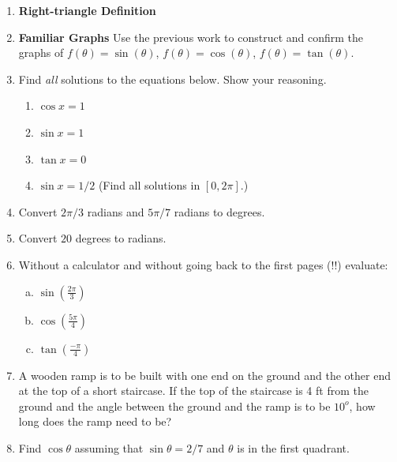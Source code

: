 \documentclass[11pt,fleqn]{article}
\begin{document}
\begin{enumerate}
\newpage
\item \textbf{Right-triangle Definition}
\vfill
\item \textbf{Familiar Graphs} Use the previous work to construct and confirm the graphs of $f(\theta)=\sin(\theta)$, $f(\theta)=\cos(\theta)$, $f(\theta)=\tan(\theta)$.
\vspace{6in}
\newpage
\item Find \emph{all} solutions to the equations below. Show your reasoning.
\begin{multicols}{2}
\begin{enumerate}
\item $\cos x =1$
\vspace{.5in}
\item $\sin x =1$
\vspace{1in}
\columnbreak
\item $\tan x = 0$
\vspace{1in}
\item $\sin x = 1/2$ (Find all solutions in $[0,2\pi].$)
\vspace{.5in}
\end{enumerate}
\end{multicols}
\vfill
\item Convert $2\pi/3$ radians and $5\pi/7$ radians to degrees.
\vfill
\item Convert $20$ degrees to radians.
\vfill
\newpage
\item Without a calculator and without going back to the first pages (!!) evaluate:
  \begin{multicols}{3}{
      \vspace*{-0.45in}
      \begin{enumerate}[(a)]
      \item $\sin (\frac{2 \pi}{3} )$
      \item $\cos( \frac{5 \pi}{4} )$
      \item $\tan(\frac{- \pi}4 )$
      \end{enumerate}}
  \end{multicols}
\vfill
\item A wooden ramp is to be built with one end on the ground and the other end at the top of a short staircase. If the top of the staircase is  4 ft from the ground and the angle between the ground and the ramp is to be $10^o$,  how long does the ramp need to be?\\
\vfill
\item Find $\cos \theta$ assuming that $\sin \theta = 2/7$ and $\theta$ is in the first quadrant.
\vspace{2in}
\end{enumerate}
\end{document}
